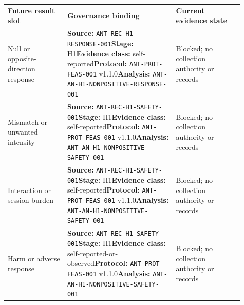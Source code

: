 \small
\begin{tabular}{@{}>{\raggedright\arraybackslash}p{0.23\linewidth}>{\raggedright\arraybackslash}p{0.42\linewidth}>{\raggedright\arraybackslash}p{0.26\linewidth}@{}}
\toprule
\multicolumn{3}{@{}l}{\textbf{GOVERNED EMPTY STATE --- ANT-TBL-006}} \\
\midrule
\textbf{Future result slot} & \textbf{Governance binding} & \textbf{Current evidence state} \\
\midrule
Null or opposite-direction response & {\scriptsize\textbf{Source:} \nolinkurl{ANT-REC-H1-RESPONSE-001}\newline \textbf{Stage:} H1\newline\textbf{Evidence class:} self-reported\newline\textbf{Protocol:} \nolinkurl{ANT-PROT-FEAS-001} v1.1.0\newline\textbf{Analysis:} \nolinkurl{ANT-AN-H1-NONPOSITIVE-RESPONSE-001}} & Blocked; no collection authority or records \\
\addlinespace[0.25em]
Mismatch or unwanted intensity & {\scriptsize\textbf{Source:} \nolinkurl{ANT-REC-H1-SAFETY-001}\newline \textbf{Stage:} H1\newline\textbf{Evidence class:} self-reported\newline\textbf{Protocol:} \nolinkurl{ANT-PROT-FEAS-001} v1.1.0\newline\textbf{Analysis:} \nolinkurl{ANT-AN-H1-NONPOSITIVE-SAFETY-001}} & Blocked; no collection authority or records \\
\addlinespace[0.25em]
Interaction or session burden & {\scriptsize\textbf{Source:} \nolinkurl{ANT-REC-H1-SAFETY-001}\newline \textbf{Stage:} H1\newline\textbf{Evidence class:} self-reported\newline\textbf{Protocol:} \nolinkurl{ANT-PROT-FEAS-001} v1.1.0\newline\textbf{Analysis:} \nolinkurl{ANT-AN-H1-NONPOSITIVE-SAFETY-001}} & Blocked; no collection authority or records \\
\addlinespace[0.25em]
Harm or adverse response & {\scriptsize\textbf{Source:} \nolinkurl{ANT-REC-H1-SAFETY-001}\newline \textbf{Stage:} H1\newline\textbf{Evidence class:} self-reported-or-observed\newline\textbf{Protocol:} \nolinkurl{ANT-PROT-FEAS-001} v1.1.0\newline\textbf{Analysis:} \nolinkurl{ANT-AN-H1-NONPOSITIVE-SAFETY-001}} & Blocked; no collection authority or records \\

\end{tabular}
